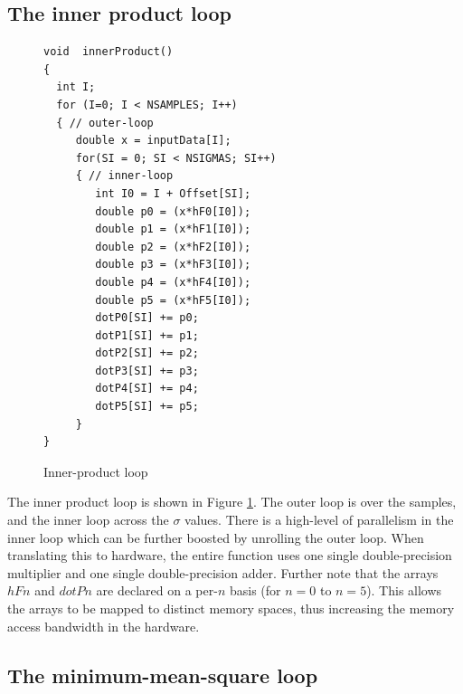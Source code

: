 \documentclass[conference]{IEEEtran}
\begin{document}
\subsection{The inner product loop} \label{sec:InnerProduct}

\begin{figure}
\begin{centering}
\small\begin{verbatim}
void  innerProduct()
{
  int I;
  for (I=0; I < NSAMPLES; I++)
  { // outer-loop
     double x = inputData[I];
     for(SI = 0; SI < NSIGMAS; SI++)
     { // inner-loop
        int I0 = I + Offset[SI];
        double p0 = (x*hF0[I0]);
        double p1 = (x*hF1[I0]);
        double p2 = (x*hF2[I0]);
        double p3 = (x*hF3[I0]);
        double p4 = (x*hF4[I0]);
        double p5 = (x*hF5[I0]);
        dotP0[SI] += p0;
        dotP1[SI] += p1;
        dotP2[SI] += p2;
        dotP3[SI] += p3;
        dotP4[SI] += p4;
        dotP5[SI] += p5;
     }
}
\end{verbatim}
\normalsize
\end{centering}
\caption{Inner-product loop}
\label{fig:InnerProduct}
\end{figure}

The inner product loop is shown in Figure \ref{fig:InnerProduct}.
The outer loop is over the samples, and the inner
loop across the $\sigma$ values.  There is a high-level
of parallelism in the inner loop which can be further
boosted by unrolling the outer loop.   When translating
this to hardware, the entire function uses one single double-precision
multiplier and one single double-precision adder.  Further
note that the arrays $hFn$ and $dotPn$ are declared on
a per-$n$ basis (for $n=0$ to $n=5$). This allows the arrays to be mapped to
distinct memory spaces, thus increasing the memory access bandwidth in the hardware.

\subsection{The minimum-mean-square loop} \label{sec:MMSE}
\end{document}
